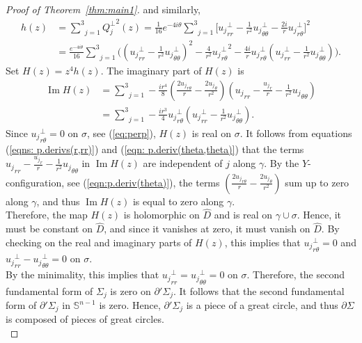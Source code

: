 \documentclass[11pt]{amsart}
\numberwithin{equation}{section}
\theoremstyle{theorem}
\theoremstyle{definition}
\numberwithin{equation}{section}
\begin{document}
\begin{proof}[Proof of Theorem~\ref{thm:main1}]
and similarly,
\begin{equation}
    \nonumber
\begin{split}
h(z)& =\underset{j=1}{\overset{3}{\sum}}{Q_j^{\perp}}^2(z)=  \frac{1}{16} e^{-4i\theta} \underset{j=1}{\overset{3}{\sum}}\Big[  {u_j}_{rr}^{\perp} - \frac{1}{r^2} {u_j}_{\theta \theta}^{\perp} - \frac{2i}{r} {u_j}_{r\theta}^{\perp} \Big]^2 \\ 
&=\frac{e^{-4i\theta}}{16} \underset{j=1}{\overset{3}{\sum}} \Big( ({u_j}_{rr}^{\perp}-\frac{1}{r^2}{u_j}_{\theta \theta}^{\perp} )^2 -\frac{4}{r^2}{{u_j}_{r\theta}^{\perp}}^2-\frac{4i}{r} {u_j}_{r\theta}^{\perp} ({u_j}_{rr}^{\perp}-\frac{1}{r^2}{u_j}_{\theta \theta}^{\perp} ) \Big).
\end{split}
\end{equation}
Set $H(z)=z^4h(z)$. The imaginary part of $H(z)$ is
\begin{equation}
    \nonumber
    \begin{split}
        \operatorname{Im} H(z)&=\underset{j=1}{\overset{3}{\sum}}-\frac{ir^4}{8} (\frac{2{u_j}_{r\theta}}{r}-\frac{2{u_j}_{\theta}}{r^2}) ( {u_j}_{rr}-\frac{{u_j}_r}{r} -\frac{1}{r^2}{u_j}_{\theta \theta} )\\
        &=\underset{j=1}{\overset{3}{\sum}}-\frac{ir^3}{4} {u_j}_{r\theta}^{\perp} ({u_j}_{rr}^{\perp}-\frac{1}{r^2}{u_j}_{\theta \theta}^{\perp} ).
 \end{split}
\end{equation}
Since ${u_j}_{r\theta}^{\perp}=0$ on $\sigma$, see (\ref{eq:perp}), $H(z)$ is real on $\sigma$. It follows from equations (\ref{eqns: p.derivs(r,rr)}) and (\ref{eqn: p.deriv(theta,theta)}) that the terms ${u_j}_{rr}-\frac{{u_j}_r}{r} -\frac{1}{r^2}{u_j}_{\theta \theta}$ in $\operatorname{Im} H(z)$ are independent of $j$ along $\gamma$. By the $Y$-configuration, see (\ref{eqn:p.deriv(theta)}), the terms $(\frac{2{u_j}_{r\theta}}{r}-\frac{2{u_j}_{\theta}}{r^2})$ sum up to zero along $\gamma$, and thus
 $\operatorname{Im} H(z)$ is equal to zero along $\gamma$.\\
Therefore, the map $H(z)$ is holomorphic on $\hat{D}$ and is real on $\gamma \cup \sigma$. Hence, it must be constant on $\hat{D}$, and since it vanishes at zero, it must vanish on $\hat{D}$. By checking on the real and imaginary parts of $H(z)$, this implies that ${u_j}_{r\theta}^{\perp}=0$ and  ${u_j}_{rr}^{\perp}-{u_j}_{\theta \theta}^{\perp}=0$ on $\sigma$.\\
By the minimality, this implies that ${u_j}_{rr}^{\perp}={u_j}_{\theta \theta}^{\perp}=0$ on $\sigma$. Therefore, the second fundamental form of $\Sigma_j$ is zero on $\partial' \Sigma_j$. It follows that the second fundamental form of $\partial' \Sigma_j$ in $\mathbb{S}^{n-1}$ is zero. Hence, $\partial' \Sigma_j$ is a piece of a great circle, and thus $\partial \Sigma$ is composed of pieces of great circles.\\


\end{proof}
\end{document}
